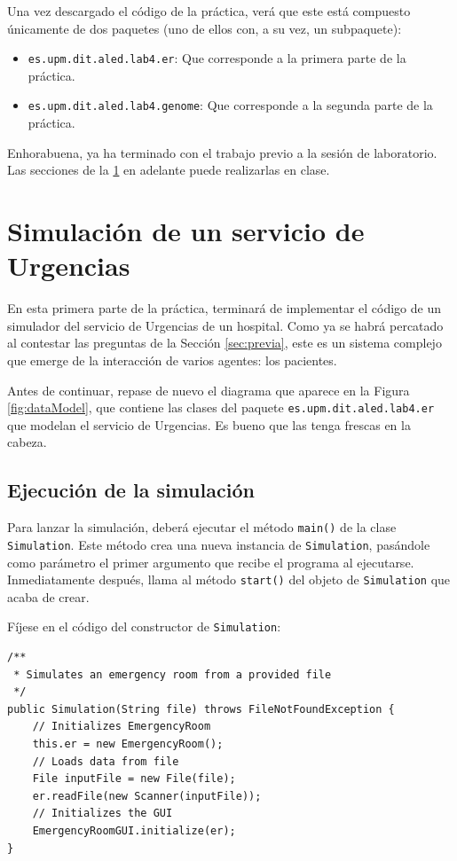 \documentclass[10pt,a4paper,spanish]{article}
\newcommand{\code}[1]{\texttt{#1}}
\begin{document}
Una vez descargado el código de la práctica, verá que este está compuesto únicamente de dos paquetes (uno de ellos con, a su vez, un subpaquete):

\begin{itemize}
    \item \code{es.upm.dit.aled.lab4.er}: Que corresponde a la primera parte de la práctica.
    \item \code{es.upm.dit.aled.lab4.genome}: Que corresponde a la segunda parte de la práctica.
\end{itemize}

Enhorabuena, ya ha terminado con el trabajo previo a la sesión de laboratorio. Las secciones de la \ref{sec:laboratorio} en adelante puede realizarlas en clase.

\section{Simulación de un servicio de Urgencias}
\label{sec:laboratorio}
\label{sec:simulacion}

En esta primera parte de la práctica, terminará de implementar el código de un simulador del servicio de Urgencias de un hospital. Como ya se habrá percatado al contestar las preguntas de la Sección \ref{sec:previa}, este es un sistema complejo que emerge de la interacción de varios agentes: los pacientes.

Antes de continuar, repase de nuevo el diagrama que aparece en la Figura \ref{fig:dataModel}, que contiene las clases del paquete \code{es.upm.dit.aled.lab4.er} que modelan el servicio de Urgencias. Es bueno que las tenga frescas en la cabeza.

\subsection{Ejecución de la simulación}

Para lanzar la simulación, deberá ejecutar el método \code{main()} de la clase \code{Simulation}. Este método crea una nueva instancia de \code{Simulation}, pasándole como parámetro el primer argumento que recibe el programa al ejecutarse. Inmediatamente después, llama al método \code{start()} del objeto de \code{Simulation} que acaba de crear.

Fíjese en el código del constructor de \code{Simulation}:

\begin{verbatim}
/**
 * Simulates an emergency room from a provided file
 */
public Simulation(String file) throws FileNotFoundException {
    // Initializes EmergencyRoom
    this.er = new EmergencyRoom();
    // Loads data from file
    File inputFile = new File(file);
    er.readFile(new Scanner(inputFile));
    // Initializes the GUI
    EmergencyRoomGUI.initialize(er);
}
\end{verbatim}
\end{document}
